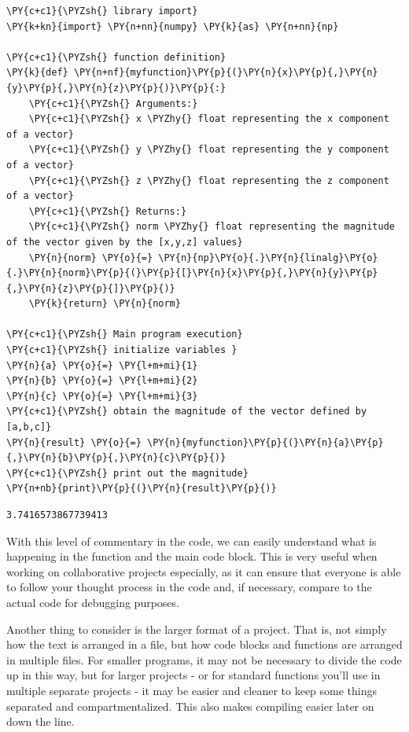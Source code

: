     \begin{tcolorbox}[breakable, size=fbox, boxrule=1pt, pad at break*=1mm,colback=cellbackground, colframe=cellborder]
\begin{Verbatim}[commandchars=\\\{\}]
\PY{c+c1}{\PYZsh{} library import}
\PY{k+kn}{import} \PY{n+nn}{numpy} \PY{k}{as} \PY{n+nn}{np}

\PY{c+c1}{\PYZsh{} function definition}
\PY{k}{def} \PY{n+nf}{myfunction}\PY{p}{(}\PY{n}{x}\PY{p}{,}\PY{n}{y}\PY{p}{,}\PY{n}{z}\PY{p}{)}\PY{p}{:}
    \PY{c+c1}{\PYZsh{} Arguments:}
    \PY{c+c1}{\PYZsh{} x \PYZhy{} float representing the x component of a vector}
    \PY{c+c1}{\PYZsh{} y \PYZhy{} float representing the y component of a vector}
    \PY{c+c1}{\PYZsh{} z \PYZhy{} float representing the z component of a vector}
    \PY{c+c1}{\PYZsh{} Returns:}
    \PY{c+c1}{\PYZsh{} norm \PYZhy{} float representing the magnitude of the vector given by the [x,y,z] values}
    \PY{n}{norm} \PY{o}{=} \PY{n}{np}\PY{o}{.}\PY{n}{linalg}\PY{o}{.}\PY{n}{norm}\PY{p}{(}\PY{p}{[}\PY{n}{x}\PY{p}{,}\PY{n}{y}\PY{p}{,}\PY{n}{z}\PY{p}{]}\PY{p}{)}
    \PY{k}{return} \PY{n}{norm}

\PY{c+c1}{\PYZsh{} Main program execution}
\PY{c+c1}{\PYZsh{} initialize variables }
\PY{n}{a} \PY{o}{=} \PY{l+m+mi}{1}
\PY{n}{b} \PY{o}{=} \PY{l+m+mi}{2}
\PY{n}{c} \PY{o}{=} \PY{l+m+mi}{3}
\PY{c+c1}{\PYZsh{} obtain the magnitude of the vector defined by [a,b,c]}
\PY{n}{result} \PY{o}{=} \PY{n}{myfunction}\PY{p}{(}\PY{n}{a}\PY{p}{,}\PY{n}{b}\PY{p}{,}\PY{n}{c}\PY{p}{)}
\PY{c+c1}{\PYZsh{} print out the magnitude}
\PY{n+nb}{print}\PY{p}{(}\PY{n}{result}\PY{p}{)}
\end{Verbatim}
\end{tcolorbox}

    \begin{Verbatim}[commandchars=\\\{\}]
3.7416573867739413
    \end{Verbatim}

    With this level of commentary in the code, we can easily understand what
is happening in the function and the main code block. This is very
useful when working on collaborative projects especially, as it can
ensure that everyone is able to follow your thought process in the code
and, if necessary, compare to the actual code for debugging purposes.

Another thing to consider is the larger format of a project. That is,
not simply how the text is arranged in a file, but how code blocks and
functions are arranged in multiple files. For smaller programs, it may
not be necessary to divide the code up in this way, but for larger
projects - or for standard functions you'll use in multiple separate
projects - it may be easier and cleaner to keep some things separated
and compartmentalized. This also makes compiling easier later on down
the line.

